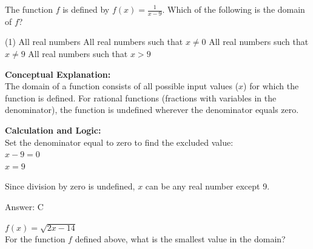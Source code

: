 \documentclass[11pt,paper=a4,answers]{exam}
\begin{document}
\begin{questions}
\pointsinrightmargin
\pointsdroppedatright
\marksnotpoints
{}
\pointformat{\boldmath\themarginpoints}
\bracketedpoints



\question
The function $f$ is defined by $f(x) = \frac{1}{x - 9}$. Which of the following is the domain of $f$?
\begin{tasks}(1)
    \task All real numbers
    \task All real numbers such that $x \neq 0$
    \task All real numbers such that $x \neq 9$
    \task All real numbers such that $x > 9$
\end{tasks}

\begin{solution}
\textbf{Conceptual Explanation:} \\
The domain of a function consists of all possible input values ($x$) for which the function is defined. For rational functions (fractions with variables in the denominator), the function is undefined wherever the denominator equals zero.

\vspace{30pt}

\textbf{Calculation and Logic:} \\
Set the denominator equal to zero to find the excluded value: \\
$x - 9 = 0$ \\
$x = 9$

\vspace{15pt}

Since division by zero is undefined, $x$ can be any real number except 9.

\vspace{30pt}

Answer: \colorbox{yellow!100}{C}
\end{solution}

\vspace{40pt}

\question
$f(x) = \sqrt{2x - 14}$ \\
For the function $f$ defined above, what is the smallest value in the domain?


\end{questions}
\end{document}
